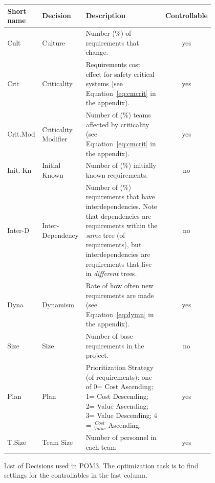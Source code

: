 \documentclass[10pt,journal,compsoc]{IEEEtran}
\newcommand{\eq}[1]{Equation~\ref{eq:#1}}
\begin{document}
\begin{figure}%
\scriptsize

  \centering
    \begin{tabular}{|l|l|p{4in}|c|}
        \hline
        Short name &Decision             & Description         &Controllable                                        \\ \hline
        Cult&Culture              & Number (\%) of requirements that change. & yes \\\hline
        Crit&Criticality           & Requirements cost effect for safety critical systems  (see \eq{cmcrit} in the appendix). & yes\\\hline
        Crit.Mod&Criticality Modifier & Number of (\%) teams affected by criticality   (see \eq{cmcrit} in the appendix).   & yes           \\ \hline
        Init. Kn&Initial Known        & Number of (\%) initially known requirements.             & no     \\ \hline
        Inter-D&Inter-Dependency     & Number of (\%) requirements that have interdependencies.  Note that dependencies are requirements within
the {\em same} tree (of requirements), but interdependencies are requirements that live in {\em different} trees.   & no            \\\hline
        Dyna&Dynamism             & Rate of how often new requirements are made (see \eq{dymn} in the appendix). & yes                    \\ \hline
        Size&Size            & Number of base requirements in the project.& no \\        \hline
        Plan&Plan                 & Prioritization Strategy (of requirements): one of
        0= Cost Ascending;  1= Cost Descending; 2= Value Ascending; 3= Value Descending;
        4 = $\frac{Cost}{Value}$ Ascending.
 & yes \\\hline
     T.Size&Team Size            & Number of personnel in each team   & yes                         \\ 
        \hline
    \end{tabular}
    \caption {List of Decisions used in POM3. 
The optimization task is to find settings for the controllables in the last column.
}\label{fig:pom3decisions}
\end{figure}
\end{document}
